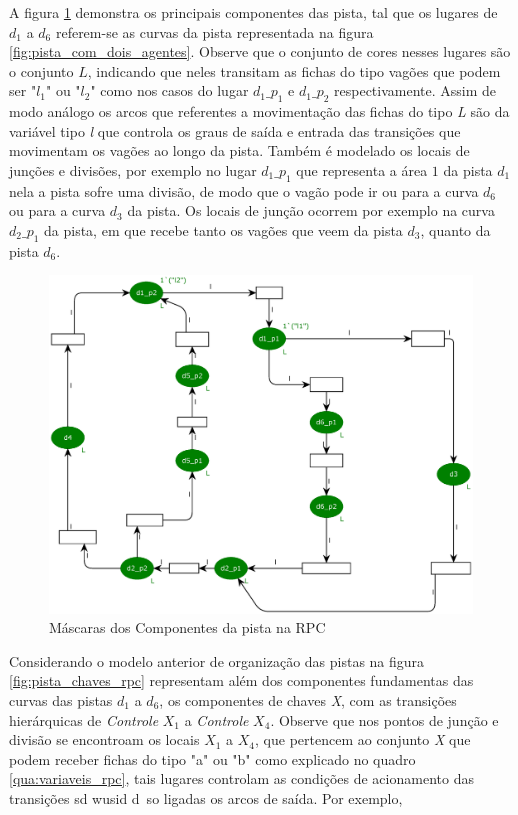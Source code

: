 A figura \ref{fig:pista_rpc} demonstra os principais componentes das pista, tal que os lugares de $d_1$ a $d_6$ referem-se as curvas da pista representada na figura \ref{fig:pista_com_dois_agentes}. Observe que o conjunto de cores nesses lugares são o conjunto $L$, indicando que neles transitam as fichas do tipo vagões que podem ser "$l_1$" ou "$l_2$" como nos casos do lugar $d_1\_p_1$ e $d_1\_p_2$ respectivamente. Assim de modo análogo os arcos que referentes a movimentação das fichas do tipo \textit{L} são da variável tipo \textit{l} que controla os graus de saída e entrada das transições que movimentam os vagões ao longo da pista. Também é modelado os locais de junções e divisões, por exemplo no lugar $d_1\_p_1$ que representa a área $1$ da pista $d_1$ nela a pista sofre uma divisão, de modo que o vagão pode ir ou para a curva $d_6$ ou para a curva $d_3$ da pista. Os locais de junção ocorrem por exemplo na curva $d_2\_p_1$ da pista, em que recebe tanto os vagões que veem da pista $d_3$, quanto da pista $d_6$.
\begin{figure}[ht]
    \centering
    \caption{Máscaras dos Componentes da pista na RPC}
    \label{fig:pista_rpc}
    \includegraphics[width=1\linewidth]{figures//Simulation//Modelagem/pista.eps}
\end{figure}
Considerando o modelo anterior de organização das pistas na figura \ref{fig:pista_chaves_rpc} representam além dos componentes fundamentas das curvas das pistas $d_1$ a $d_6$, os componentes de chaves \textit{X}, com as transições hierárquicas de \textit{Controle} $X_1$ a \textit{Controle} $X_4$. Observe que nos pontos de junção e divisão se encontroam os locais $X_1$ a $X_4$, que pertencem ao conjunto \textit{X} que podem receber fichas do tipo "a" ou "b" como explicado no quadro \ref{qua:variaveis_rpc}, tais lugares controlam as condições de acionamento das transições sd wusid d~so ligadas os arcos de saída. Por exemplo, 
